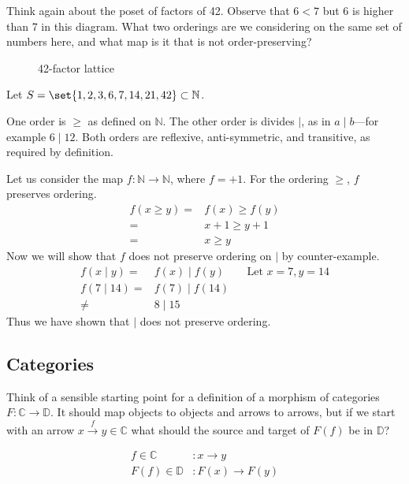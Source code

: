 \begin{ttta}
Think again about the poset of factors of 42.
Observe that $6 < 7$ but 6 is higher than 7 in this diagram. What two orderings
are we considering on the same set of numbers here, and what map is it that is
not order-preserving?
\end{ttta}
\begin{figure}[H]
    \begin{center}
        
    \end{center}
    \caption{42-factor lattice}
\end{figure}
\begin{proofitem}
\item Let $S=\set{1,2, 3, 6, 7, 14, 21, 42}\subset \mathbb{N}$.
\item One order is $\geq$ as defined on $\mathbb{N}$.
    The other order is divides $\mid$, as in $a\mid b$---for example $6\mid 12$.
    Both orders are reflexive, anti-symmetric, and transitive, as required by
    definition.
\item Let us consider the map $f:\mathbb{N}\rightarrow\mathbb{N}$, where $f=+1$.
    For the ordering $\geq$, $f$ preserves ordering.
\begin{align*}
    f(x \geq y) =& f(x) \geq f(y)\\
        =& x+1 \geq y+1\\
        =& x \geq y
\end{align*}
Now we will show that $f$ does not preserve ordering on $\mid$ by
counter-example.
\begin{align*}
    f(x \mid y) =& f(x) \mid f(y)&&\text{Let }x=7, y=14\\
    f(7 \mid 14) =& f(7) \mid f(14)\\
     \neq& 8 \mid 15
\end{align*}
Thus we have shown that $\mid$ does not preserve ordering.
\end{proofitem}

\subsection{Categories}
\begin{ttta}
Think of a sensible starting point for a definition of a morphism of
categories $F: \mathbb{C} \longrightarrow \mathbb{D}$. It should map objects to
objects and arrows to arrows, but if we start with an arrow $x \xrightarrow{f}
y\in\mathbb{C}$ what should the source and target of $F(f)$ be in
$\mathbb{D}$?
\end{ttta}
\begin{proofitem}
    \item
    \begin{align*}
        f\in \mathbb{C}&: x \rightarrow y\\
        F(f)\in \mathbb{D}&: F(x) \rightarrow F(y)
    \end{align*}
\end{proofitem}

